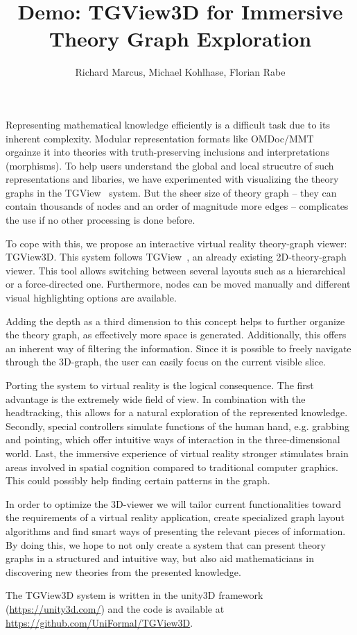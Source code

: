 \documentclass{llncs}
\title{Demo: TGView3D for Immersive Theory Graph Exploration}
\author{Richard Marcus, Michael Kohlhase, Florian Rabe}
\institute{Computer Science, FAU Erlangen-N\"urnberg}
\begin{document}
\maketitle

Representing mathematical knowledge efficiently is a difficult task due to its inherent complexity.
Modular representation formats like OMDoc/MMT~\cite{Kohlhase:OMDoc1.2,RabKoh:WSMSML13} orgainze it into theories with truth-preserving inclusions and interpretations (morphisms).
To help users understand the global and local strucutre of such representations and libaries, we have experimented with visualizing the theory graphs in the TGView~\cite{RupKohMue:fitgv17} system. But the sheer size of theory graph -- they can contain thousands of nodes and an order of magnitude more edges -- complicates the use if no other processing is done before.

To cope with this, we propose an interactive virtual reality theory-graph viewer: TGView3D. This system follows TGView~\cite{RupKohMue:fitgv17}, an already existing 2D-theory-graph viewer. This tool allows switching between several layouts such as a hierarchical or a force-directed one. Furthermore, nodes can be moved manually and different visual highlighting options are available.

Adding the depth as a third dimension to this concept helps to further organize the theory graph, as effectively more space is generated. Additionally, this offers an inherent way of filtering the information. Since it is possible to freely navigate through the 3D-graph, the user can easily focus on the current visible slice.

Porting the system to virtual reality is the logical consequence. The first advantage is the extremely wide field of view. In combination with the headtracking, this allows for a natural exploration of the represented knowledge. Secondly, special controllers simulate functions of the human hand, e.g. grabbing and pointing, which offer intuitive ways of interaction in the three-dimensional world. Last, the immersive experience of virtual reality stronger stimulates brain areas involved in spatial cognition compared to traditional computer graphics. This could possibly help finding certain patterns in the graph.

In order to optimize the 3D-viewer we will tailor current functionalities toward the
requirements of a virtual reality application, create specialized graph layout algorithms
and find smart ways of presenting the relevant pieces of information. By doing this, we
hope to not only create a system that can present theory graphs in a structured and
intuitive way, but also aid mathematicians in discovering new theories from the presented
knowledge.

The TGView3D system is written in the unity3D framework (\url{https://unity3d.com/}) and the code is available at \url{https://github.com/UniFormal/TGView3D}.

\printbibliography
\end{document}

